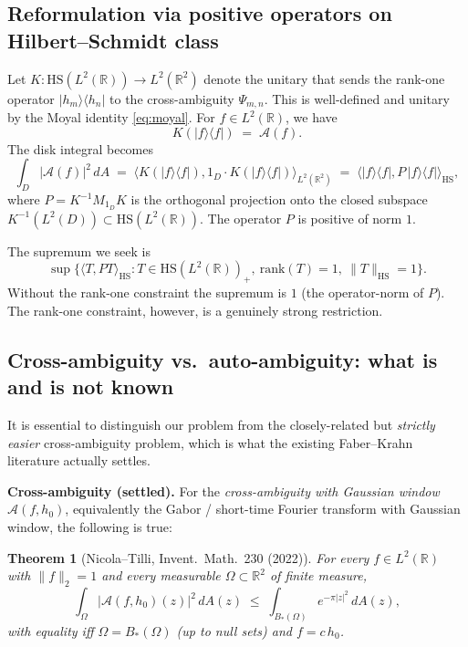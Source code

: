 \documentclass[11pt]{article}
\newtheorem{theorem}{Theorem}[section]
\theoremstyle{definition}
\newcommand{\R}{\mathbb{R}}
\newcommand{\Amb}{\mathcal{A}}
\newcommand{\norm}[1]{\lVert#1\rVert}
\newcommand{\inner}[2]{\langle#1,#2\rangle}
\begin{document}
\subsection{Reformulation via positive operators on Hilbert--Schmidt class}

Let $K\colon \mathrm{HS}(L^{2}(\R))\to L^{2}(\R^{2})$ denote the unitary that
sends the rank-one operator $|h_{m}\rangle\langle h_{n}|$ to the cross-ambiguity
$\Psi_{m,n}$.  This is well-defined and unitary by the Moyal identity
\eqref{eq:moyal}.  For $f\in L^{2}(\R)$, we have
\[
  K(|f\rangle\langle f|) \;=\; \Amb(f).
\]
The disk integral becomes
\begin{equation}\label{eq:hs-form}
  \int_{D}|\Amb(f)|^{2}\,dA
  \;=\; \inner{K(|f\rangle\langle f|)}{1_{D}\cdot K(|f\rangle\langle f|)}_{L^{2}(\R^{2})}
  \;=\; \inner{|f\rangle\langle f|}{P\,|f\rangle\langle f|}_{\mathrm{HS}},
\end{equation}
where $P=K^{-1}M_{1_{D}}K$ is the orthogonal projection onto the closed
subspace $K^{-1}(L^{2}(D))\subset\mathrm{HS}(L^{2}(\R))$.  The operator
$P$ is positive of norm $1$.

The supremum we seek is
\begin{equation}\label{eq:rk1-sup}
  \sup\bigl\{\inner{T}{PT}_{\mathrm{HS}} : T\in\mathrm{HS}(L^{2}(\R))_{+},\
    \mathrm{rank}(T)=1,\ \norm{T}_{\mathrm{HS}}=1\bigr\}.
\end{equation}
Without the rank-one constraint the supremum is $1$ (the operator-norm of
$P$).  The rank-one constraint, however, is a genuinely strong restriction.

\subsection{Cross-ambiguity vs.\ auto-ambiguity: what is and is not known}\label{sec:cross-vs-auto}

It is essential to distinguish our problem from the closely-related but
\emph{strictly easier} cross-ambiguity problem, which is what the existing
Faber--Krahn literature actually settles.

\smallskip
\noindent\textbf{Cross-ambiguity (settled).}  For the
\emph{cross-ambiguity with Gaussian window} $\Amb(f,h_{0})$, equivalently
the Gabor / short-time Fourier transform with Gaussian window, the
following is true:

\begin{theorem}[Nicola--Tilli, Invent.\ Math.\ 230 (2022)]\label{thm:NT-STFT}
For every $f\in L^{2}(\R)$ with $\norm{f}_{2}=1$ and every measurable
$\Omega\subset\R^{2}$ of finite measure,
\[
  \int_{\Omega}|\Amb(f,h_{0})(z)|^{2}\,dA(z)
  \;\le\; \int_{B_{*}(\Omega)} e^{-\pi|z|^{2}}\,dA(z),
\]
with equality iff $\Omega=B_{*}(\Omega)$ \textup{(}up to null sets\textup{)} and $f=c\,h_{0}$.
\end{theorem}
\end{document}
